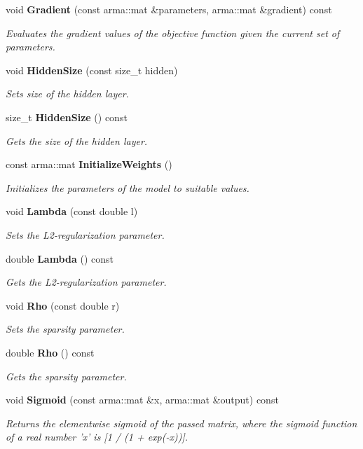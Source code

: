 \begin{DoxyCompactItemize}
void {\bf Gradient} (const arma\-::mat \&parameters, arma\-::mat \&gradient) const 
\begin{DoxyCompactList}\small\item\em Evaluates the gradient values of the objective function given the current set of parameters. \end{DoxyCompactList}\item 
void {\bf Hidden\-Size} (const size\-\_\-t hidden)
\begin{DoxyCompactList}\small\item\em Sets size of the hidden layer. \end{DoxyCompactList}\item 
size\-\_\-t {\bf Hidden\-Size} () const 
\begin{DoxyCompactList}\small\item\em Gets the size of the hidden layer. \end{DoxyCompactList}\item 
const arma\-::mat {\bf Initialize\-Weights} ()
\begin{DoxyCompactList}\small\item\em Initializes the parameters of the model to suitable values. \end{DoxyCompactList}\item 
void {\bf Lambda} (const double l)
\begin{DoxyCompactList}\small\item\em Sets the L2-\/regularization parameter. \end{DoxyCompactList}\item 
double {\bf Lambda} () const 
\begin{DoxyCompactList}\small\item\em Gets the L2-\/regularization parameter. \end{DoxyCompactList}\item 
void {\bf Rho} (const double r)
\begin{DoxyCompactList}\small\item\em Sets the sparsity parameter. \end{DoxyCompactList}\item 
double {\bf Rho} () const 
\begin{DoxyCompactList}\small\item\em Gets the sparsity parameter. \end{DoxyCompactList}\item 
void {\bf Sigmoid} (const arma\-::mat \&x, arma\-::mat \&output) const 
\begin{DoxyCompactList}\small\item\em Returns the elementwise sigmoid of the passed matrix, where the sigmoid function of a real number 'x' is [1 / (1 + exp(-\/x))]. \end{DoxyCompactList}\item 

\end{DoxyCompactItemize}
